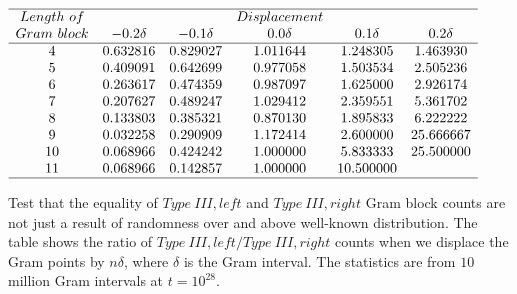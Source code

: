 \documentclass[twoside]{article}
\begin{document}
\begin{table}
\centering \(\begin{array}{cccccc}
\hline
Length~of 	& &&Displacement \\
Gram~block	& -0.2\delta & -0.1\delta & 0.0\delta & 0.1\delta & 0.2\delta  \\
\hline
4 &0.632816&0.829027&1.011644&1.248305&1.463930 \\
5 &0.409091&0.642699&0.977058&1.503534&2.505236 \\
6 &0.263617&0.474359&0.987097&1.625000&2.926174 \\
7 &0.207627&0.489247&1.029412&2.359551&5.361702 \\
8 &0.133803&0.385321&0.870130&1.895833&6.222222 \\
9 &0.032258&0.290909&1.172414&2.600000&25.666667 \\
10 &0.068966&0.424242&1.000000&5.833333&25.500000 \\
11 &0.068966&0.142857&1.000000&10.500000& \\
\hline
\end{array}\)
\caption{Test that the equality of  $Type~III,left$ and $Type~III,right$ Gram block counts are not just a result of randomness over and above well-known distribution. The table shows the ratio of $Type~III,left/Type~III,right$ counts when we displace the Gram points by $n\delta$, where $\delta$ is the Gram interval. The statistics are from $10$ million Gram intervals at $t=10^{28}$.} \label{tab:rosser3random}
\end{table}
\end{document}
